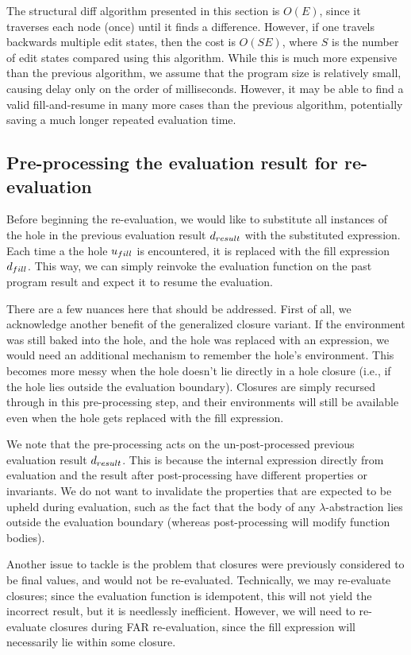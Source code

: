 The structural diff algorithm presented in this section is $O(E)$, since it traverses each node (once) until it finds a difference. However, if one travels backwards multiple edit states, then the cost is $O(SE)$, where $S$ is the number of edit states compared using this algorithm. While this is much more expensive than the previous algorithm, we assume that the program size is relatively small, causing delay only on the order of milliseconds. However, it may be able to find a valid fill-and-resume in many more cases than the previous algorithm, potentially saving a much longer repeated evaluation time.

\subsection{Pre-processing the evaluation result for re-evaluation}
\label{sec:far-preprocessing}

Before beginning the re-evaluation, we would like to substitute all instances of the hole in the previous evaluation result $d_{result}$ with the substituted expression. Each time a the hole $u_{fill}$ is encountered, it is replaced with the fill expression $d_{fill}$. This way, we can simply reinvoke the evaluation function on the past program result and expect it to resume the evaluation.

There are a few nuances here that should be addressed. First of all, we acknowledge another benefit of the generalized closure variant. If the environment was still baked into the hole, and the hole was replaced with an expression, we would need an additional mechanism to remember the hole's environment. This becomes more messy when the hole doesn't lie directly in a hole closure (i.e., if the hole lies outside the evaluation boundary). Closures are simply recursed through in this pre-processing step, and their environments will still be available even when the hole gets replaced with the fill expression.

We note that the pre-processing acts on the un-post-processed previous evaluation result $d_{result}$. This is because the internal expression directly from evaluation and the result after post-processing have different properties or invariants. We do not want to invalidate the properties that are expected to be upheld during evaluation, such as the fact that the body of any $\lambda$-abstraction lies outside the evaluation boundary (whereas post-processing will modify function bodies).

Another issue to tackle is the problem that closures were previously considered to be final values, and would not be re-evaluated. Technically, we may re-evaluate closures; since the evaluation function is idempotent, this will not yield the incorrect result, but it is needlessly inefficient. However, we will need to re-evaluate closures during FAR re-evaluation, since the fill expression will necessarily lie within some closure.

